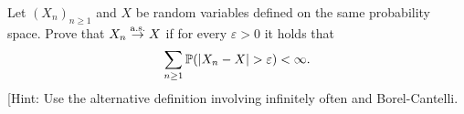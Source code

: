 \begin{problem}
Let $(X_n)_{n \ge 1}$ and $X$ be random variables defined on the same probability space. Prove that $X_n \stackrel{\mathrm{a.s.}}{\rightarrow} X$ if for every $\varepsilon > 0$ it holds that
\[
	\sum_{n \ge 1} \mathbb P(|X_n - X| > \varepsilon) < \infty.
\]
[Hint: Use the alternative definition involving infinitely often and Borel-Cantelli.
\end{problem}
